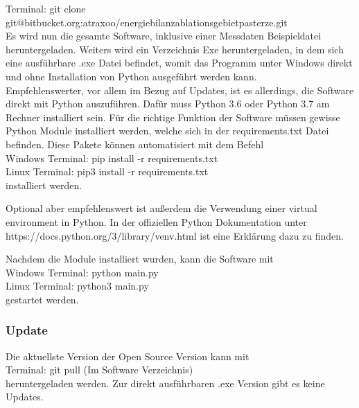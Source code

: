 \documentclass[11pt,a4paper]{article}
\begin{document}
Terminal: \textsf{\small git clone git@bitbucket.org:atraxoo/energiebilanzablationsgebietpasterze.git}\\


Es wird nun die gesamte Software, inklusive einer Messdaten Beispieldatei heruntergeladen. Weiters wird ein Verzeichnis Exe heruntergeladen, in dem sich eine ausführbare .exe Datei befindet, womit das Programm unter Windows direkt und ohne Installation von Python ausgeführt werden kann.\\

Empfehlenswerter, vor allem im Bezug auf Updates, ist es allerdings, die Software direkt mit Python auszuführen. Dafür muss Python 3.6 oder Python 3.7 am Rechner installiert sein. Für die richtige Funktion der Software müssen gewisse Python Module installiert werden, welche sich in der requirements.txt Datei befinden. Diese Pakete können automatisiert mit dem Befehl\\

Windows Terminal: \textsf{\small pip install -r requirements.txt}\\
Linux Terminal:  \textsf{\small pip3 install -r requirements.txt}\\

installiert werden.

Optional aber empfehlenswert ist außerdem die Verwendung einer virtual environment in Python. In der offiziellen Python Dokumentation unter \textsf{\small https://docs.python.org/3/library/venv.html} ist eine Erklärung dazu zu finden.

Nachdem die Module installiert wurden, kann die Software mit \\

Windows Terminal: \textsf{\small python main.py}\\
Linux Terminal: \textsf{\small python3 main.py}\\

gestartet werden.

\subsubsection{Update}
Die aktuellste Version der Open Source Version kann mit \\

Terminal: \textsf{\small git pull} (Im Software Verzeichnis)\\

heruntergeladen werden. Zur direkt ausführbaren .exe Version gibt es keine Updates.
\end{document}

